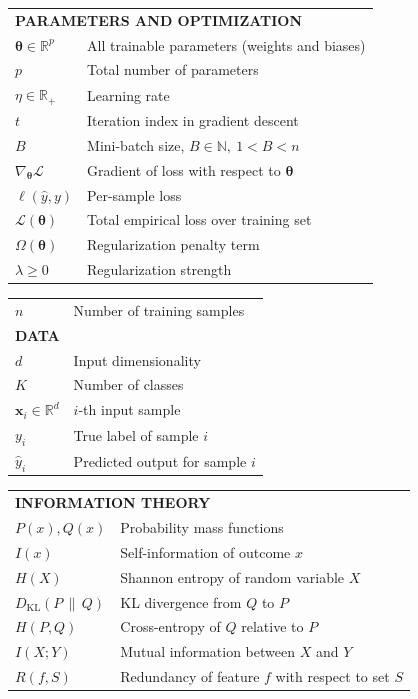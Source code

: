 \begin{longtable}{p{} p{}}
\multicolumn{2}{l}{\textbf{PARAMETERS AND OPTIMIZATION}} \\
$\boldsymbol{\theta} \in \mathbb{R}^p$ & All trainable parameters (weights and biases) \\
$p$ & Total number of parameters \\
$\eta \in \mathbb{R}_+$ & Learning rate \\
$t$ & Iteration index in gradient descent \\
$B$ & Mini-batch size, $B \in \mathbb{N},\ 1 < B < n$ \\
$\nabla_{\boldsymbol{\theta}} \mathcal{L}$ & Gradient of loss with respect to $\boldsymbol{\theta}$ \\
$\ell(\hat{y}, y)$ & Per-sample loss \\
$\mathcal{L}(\boldsymbol{\theta})$ & Total empirical loss over training set \\
$\Omega(\boldsymbol{\theta})$ & Regularization penalty term \\
$\lambda \geq 0$ & Regularization strength
\end{longtable}

\begin{longtable}{p{} p{}}$n$ & Number of training samples \\
\multicolumn{2}{l}{\textbf{DATA}} \\[0.3em]
$d$ & Input dimensionality \\
$K$ & Number of classes \\
$\mathbf{x}_i \in \mathbb{R}^d$ & $i$-th input sample \\
$y_i$ & True label of sample $i$ \\
$\hat{y}_i$ & Predicted output for sample $i$
\end{longtable}
\begin{longtable}{p{} p{}}
\multicolumn{2}{l}{\textbf{INFORMATION THEORY}} \\ [0.3em]
$P(x), Q(x)$ & Probability mass functions \\
$I(x)$ & Self-information of outcome $x$ \\
$H(X)$ & Shannon entropy of random variable $X$ \\
$D_{\mathrm{KL}}(P \,\|\, Q)$ & KL divergence from $Q$ to $P$ \\
$H(P, Q)$ & Cross-entropy of $Q$ relative to $P$ \\
$I(X; Y)$ & Mutual information between $X$ and $Y$ \\
$R(f, S)$ & Redundancy of feature $f$ with respect to set $S$
\end{longtable}


